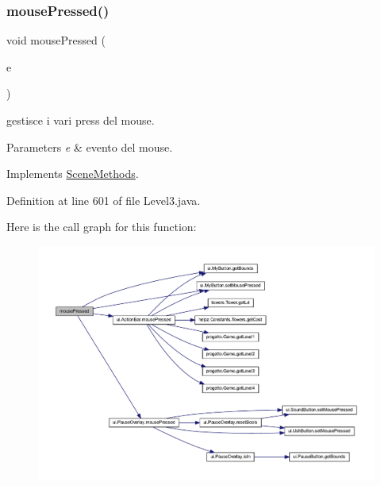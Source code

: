 \subsubsection{\texorpdfstring{mouse\+Pressed()}{mousePressed()}}
{\footnotesize\ttfamily void mouse\+Pressed (\begin{DoxyParamCaption}\item[{Mouse\+Event}]{e }\end{DoxyParamCaption})}



gestisce i vari press del mouse. 


\begin{DoxyParams}{Parameters}
{\em e} & evento del mouse. \\
\hline
\end{DoxyParams}


Implements \hyperlink{interfacescenes_1_1_scene_methods_aed82e1ce3dd3cf283d508c3ba3be70ef}{Scene\+Methods}.



Definition at line 601 of file Level3.\+java.

Here is the call graph for this function\+:\nopagebreak
\begin{figure}[H]
\begin{center}
\leavevmode
\includegraphics[width=350pt]{classscenes_1_1_level3_aed82e1ce3dd3cf283d508c3ba3be70ef_cgraph}
\end{center}
\end{figure}
\mbox{\label{classscenes_1_1_level3_a87a07291794e15052db67f945d90853e}} 
